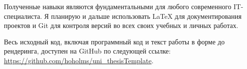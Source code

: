 \documentclass[a4paper,12pt]{report}
\newcommand{\github}{\url{https://github.com/hoholms/uni_thesisTemplate}}
\begin{document}
    Полученные навыки являются фундаментальными для любого современного IT-специалиста.
    Я планирую и дальше использовать \LaTeX{} для документирования проектов и Git для контроля версий во всех своих учебных и личных работах.

    Весь исходный код, включая программный код и текст работы
    в форме до рендеринга, доступен на GitHub по следующей ссылке: \github.

    \bibliographyChapter

%
%

    \declarationPage{}
\end{document}
